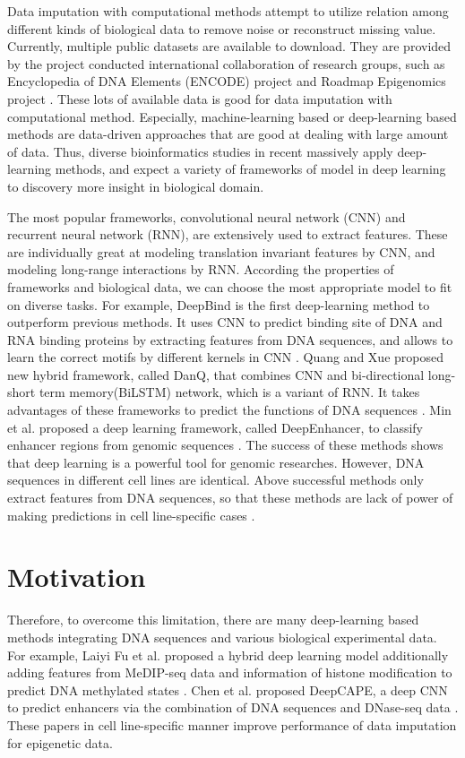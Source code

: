 Data imputation with computational methods attempt to utilize relation among different kinds of biological data to remove noise or reconstruct missing value. Currently, multiple public datasets are available to download. They are provided by the project conducted international collaboration of research groups, such as Encyclopedia of DNA Elements (ENCODE) project \cite{davis2018encyclopedia} and Roadmap Epigenomics project \cite{kundaje2015integrative}. These lots of available data is good for data imputation with computational method. Especially, machine-learning based or deep-learning based methods are data-driven approaches that are good at dealing with large amount of data. Thus, diverse bioinformatics studies in recent massively apply deep-learning methods, and expect a variety of frameworks of model in deep learning to discovery more insight in biological domain.

The most popular frameworks, convolutional neural network (CNN) and recurrent neural network (RNN), are extensively used to extract features. These are individually great at modeling translation invariant features by CNN, and modeling long-range interactions by RNN. According the properties of frameworks and biological data, we can choose the most appropriate model to fit on diverse tasks. For example, DeepBind is the first deep-learning method to outperform previous methods. It uses CNN to predict binding site of DNA and RNA binding proteins by extracting features from DNA sequences, and allows to learn the correct motifs by different kernels in CNN \cite{alipanahi2015predicting}. Quang and Xue proposed new hybrid framework, called DanQ, that combines CNN and bi-directional long-short term memory(BiLSTM) network, which is a variant of RNN. It takes advantages of these frameworks to predict the functions of DNA sequences \cite{quang2016danq}. Min et al. proposed a deep learning framework, called DeepEnhancer, to classify enhancer regions from genomic sequences \cite{min2016deepenhancer}. The success of these methods shows that deep learning is a powerful tool for genomic researches. However, DNA sequences in different cell lines are identical. Above successful methods only extract features from DNA sequences, so that these methods are lack of power of making predictions in cell line-specific cases \cite{yin2019deephistone}\cite{chen2021deepcape}.

\section{Motivation}
Therefore, to overcome this limitation, there are many deep-learning based methods integrating DNA sequences and various biological experimental data. For example, Laiyi Fu et al. proposed a hybrid deep learning model additionally adding features from MeDIP-seq data and information of histone modification to predict DNA methylated states \cite{fu2019predicting}. Chen et al. proposed DeepCAPE, a deep CNN to predict enhancers via the combination of DNA sequences and DNase-seq data \cite{chen2021deepcape}. These papers in cell line-specific manner improve performance of data imputation for epigenetic data.

